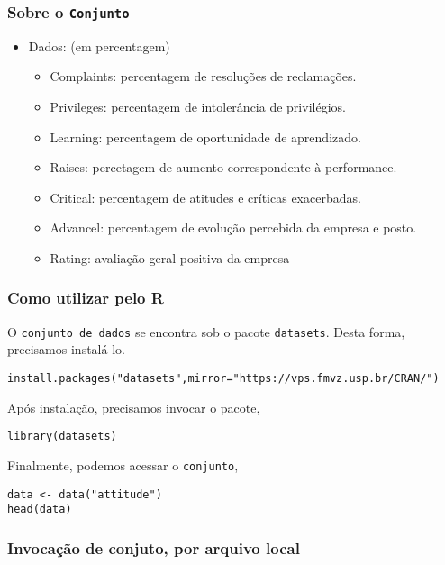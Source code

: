 \documentclass[12pt]{article}
\begin{document}
\subsubsection{Sobre o \texttt{Conjunto}}
\label{sec:org1e5b938}
\begin{itemize}
\item Dados: (em percentagem)
\begin{itemize}
\item Complaints: percentagem de resoluções de reclamações.
\item Privileges: percentagem de intolerância de privilégios.
\item Learning: percentagem de oportunidade de aprendizado.
\item Raises: percetagem de aumento correspondente à performance.
\item Critical: percentagem de atitudes e críticas exacerbadas.
\item Advancel: percentagem de evolução percebida da empresa e posto.
\item Rating: avaliação geral positiva da empresa
\end{itemize}
\end{itemize}

\subsubsection{Como utilizar pelo R}
\label{sec:orgc310b70}
O \texttt{conjunto de dados} se encontra sob o pacote \texttt{datasets}. Desta forma, precisamos
instalá-lo.

\begin{verbatim}
install.packages("datasets",mirror="https://vps.fmvz.usp.br/CRAN/")
\end{verbatim}

Após instalação, precisamos invocar o pacote,
\begin{verbatim}
library(datasets)
\end{verbatim}

Finalmente, podemos acessar o \texttt{conjunto},
\begin{verbatim}
data <- data("attitude")
head(data)
\end{verbatim}
\subsubsection{Invocação de conjuto, por arquivo local}
\label{sec:orgb9dad86}
\end{document}
